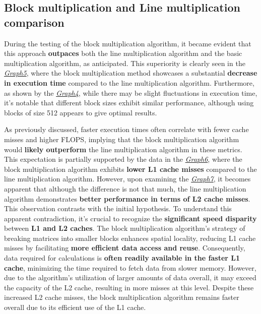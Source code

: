 \subsection{Block multiplication and Line multiplication comparison}
During the testing of the block multiplication algorithm, it
became evident that this approach \textbf{outpaces} both the line multiplication
algorithm and the basic multiplication algorithm, as anticipated.
This superiority is clearly seen in the \textit{\hyperref[graph:BLG8]{Graph5}}, where the
block multiplication method showcases a substantial \textbf{decrease in
    execution time} compared to the line multiplication algorithm.
Furthermore, as shown by the \textit{\hyperref[graph:BLG4]{Graph4}}, while there
may be slight fluctuations in execution time, it's notable that
different block sizes exhibit similar performance, although using blocks of
size 512 appears to give optimal results.

As previously discussed, faster execution times often correlate with fewer cache
misses and higher FLOPS, implying that the
block multiplication algorithm would \textbf{likely outperform} the line multiplication
algorithm in these metrics. This expectation is partially supported by the data in
the \textit{\hyperref[graph:BLG6]{Graph6}}, where the block multiplication algorithm
exhibits \textbf{lower L1 cache misses} compared to the line multiplication algorithm.
However, upon examining the \textit{\hyperref[graph:BLG7]{Graph7}},
it becomes apparent that although the difference is not that much,
the line multiplication algorithm demonstrates \textbf{better performance in terms of L2
    cache misses}. This observation contrasts with the initial hypothesis. To
understand this apparent contradiction, it's crucial to recognize the \textbf{significant
    speed disparity} between \textbf{L1 and L2 caches}. The block multiplication algorithm's
strategy of breaking matrices into smaller blocks enhances spatial locality,
reducing L1 cache misses by facilitating \textbf{more efficient data access and reuse}.
Consequently, data required for calculations is \textbf{often readily available in the
    faster L1 cache}, minimizing the time required to fetch data from slower memory.
However, due to the algorithm's utilization of larger amounts of data overall,
it may exceed the capacity of the L2 cache, resulting in more misses at this
level. Despite these increased L2 cache misses, the block multiplication
algorithm remains faster overall due to its efficient use of the L1 cache.


